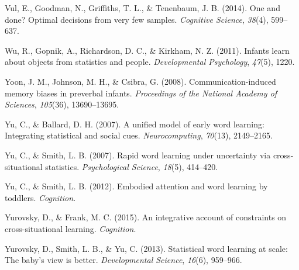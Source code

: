 \documentclass[authoryear, review]{elsarticle}
\begin{document}
Vul, E., Goodman, N., Griffiths, T. L., \& Tenenbaum, J. B. (2014). One
and done? Optimal decisions from very few samples. \emph{Cognitive
Science}, \emph{38}(4), 599--637.

Wu, R., Gopnik, A., Richardson, D. C., \& Kirkham, N. Z. (2011). Infants
learn about objects from statistics and people. \emph{Developmental
Psychology}, \emph{47}(5), 1220.

Yoon, J. M., Johnson, M. H., \& Csibra, G. (2008). Communication-induced
memory biases in preverbal infants. \emph{Proceedings of the National
Academy of Sciences}, \emph{105}(36), 13690--13695.

Yu, C., \& Ballard, D. H. (2007). A unified model of early word
learning: Integrating statistical and social cues.
\emph{Neurocomputing}, \emph{70}(13), 2149--2165.

Yu, C., \& Smith, L. B. (2007). Rapid word learning under uncertainty
via cross-situational statistics. \emph{Psychological Science},
\emph{18}(5), 414--420.

Yu, C., \& Smith, L. B. (2012). Embodied attention and word learning by
toddlers. \emph{Cognition}.

Yurovsky, D., \& Frank, M. C. (2015). An integrative account of
constraints on cross-situational learning. \emph{Cognition}.

Yurovsky, D., Smith, L. B., \& Yu, C. (2013). Statistical word learning
at scale: The baby's view is better. \emph{Developmental Science},
\emph{16}(6), 959--966.


\end{document}
